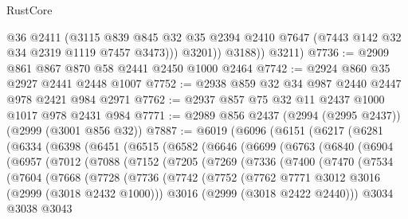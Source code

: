 \begin{lexlean}{RustCore}
\begin{coremodule}
                @36
                @2411
                (@3115
                  @839
                  @845
                  @32
                  @35
                  @2394
                  @2410
                  @7647
                  (@7443 @142 @32 @34 @2319 @1119 @7457 @3473)))
              @3201))
          @3188))
      @3211)
@7736 := @2909 @861 @867 @870 @58 @2441 @2450 @1000 @2464
@7742 := @2924 @860 @35 @2927 @2441 @2448 @1007
@7752 := @2938 @859 @32 @34 @987 @2440 @2447 @978 @2421 @984 @2971
@7762 := @2937 @857 @75 @32 @11 @2437 @1000 @1017 @978 @2431 @984
@7771 := @2989 @856 @2437 (@2994 (@2995 @2437)) (@2999 (@3001 @856 @32))
@7887 := @6019
    (@6096
      (@6151
        (@6217
          (@6281
            (@6334
              (@6398
                (@6451
                  (@6515
                    (@6582
                      (@6646
                        (@6699
                          (@6763
                            (@6840
                              (@6904
                                (@6957
                                  (@7012
                                    (@7088
                                      (@7152
                                        (@7205
                                          (@7269
                                            (@7336
                                              (@7400
                                                (@7470
                                                  (@7534
                                                    (@7604
                                                      (@7668
                                                        (@7728
                                                          (@7736
                                                            (@7742
                                                              (@7752
                                                                (@7762
                                                                  @7771
                                                                  @3012
                                                                  @3016
                                                                  (@2999 (@3018 @2432 @1000)))
                                                                @3016
                                                                (@2999 (@3018 @2422 @2440)))
                                                              @3034
                                                              @3038
                                                              @3043

\end{coremodule}
\end{lexlean}
